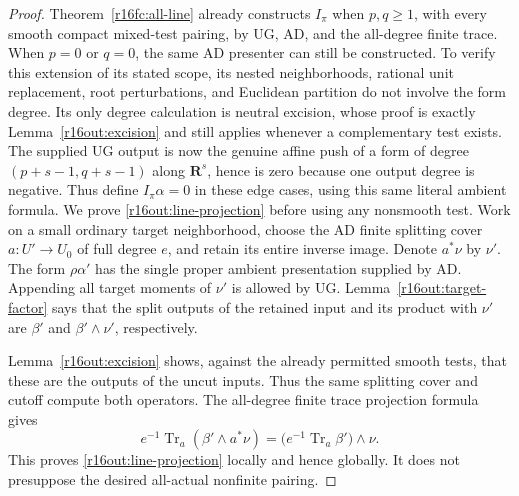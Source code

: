 \begin{proof}
Theorem~\ref{r16fc:all-line} already constructs $I_\pi$ when
$p,q\geq1$, with every smooth compact mixed-test pairing, by UG,
AD, and the all-degree finite trace.  When $p=0$ or $q=0$, the same
AD presenter can still be constructed.  To verify this extension
of its stated scope, its nested neighborhoods, rational unit
replacement, root perturbations, and Euclidean partition do not
involve the form degree.  Its only degree calculation is neutral
excision, whose proof is exactly Lemma~\ref{r16out:excision} and
still applies whenever a complementary test exists.  The supplied
UG output is now the genuine affine push of a form of degree
$(p+s-1,q+s-1)$ along $\mathbf R^s$, hence is zero because one
output degree is negative.  Thus define $I_\pi\alpha=0$ in these
edge cases, using this same literal ambient formula.  We prove
\eqref{r16out:line-projection} before using any nonsmooth test.
Work on a small ordinary target neighborhood, choose the AD
finite splitting cover $a:U'\to U_0$ of full degree $e$, and
retain its entire inverse image.  Denote $a^*\nu$ by $\nu'$.
The form $\rho\alpha'$ has the single proper ambient presentation
supplied by AD.  Appending all target moments of $\nu'$ is allowed
by UG.  Lemma~\ref{r16out:target-factor} says that the split outputs
of the retained input and its product with $\nu'$ are $\beta'$
and $\beta'\wedge\nu'$, respectively.

Lemma~\ref{r16out:excision} shows, against the already permitted
smooth tests, that these are the outputs of the uncut inputs.
Thus the same splitting cover and cutoff compute both operators.
The all-degree finite trace projection formula gives
\[
 e^{-1}\operatorname{Tr}_a(\beta'\wedge a^*\nu)
       =\bigl(e^{-1}\operatorname{Tr}_a\beta'\bigr)\wedge\nu.
 \tag{OUT16.6}\label{r16out:finite-projection}
\]
This proves \eqref{r16out:line-projection} locally and hence globally.
It does not presuppose the desired all-actual nonfinite pairing.


\end{proof}

